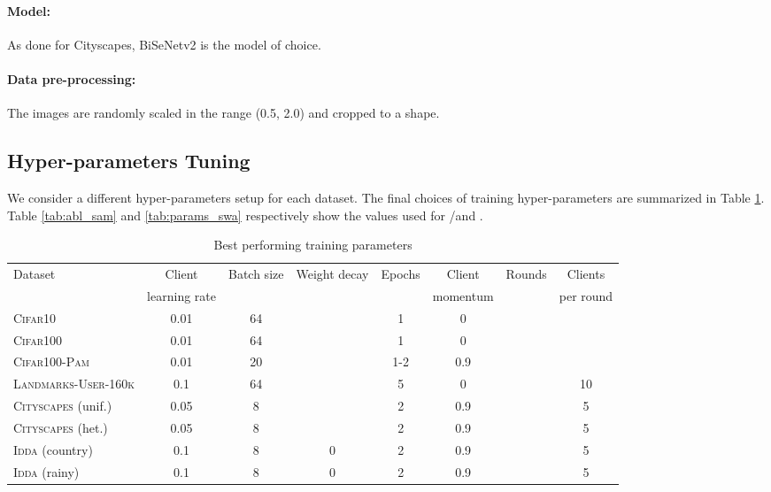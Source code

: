 \paragraph{Model:} As done for Cityscapes, BiSeNetv2 is the model of choice.

\paragraph{Data pre-processing:} The images are randomly scaled in the range (0.5, 2.0) and cropped to a  shape. 

\subsection{Hyper-parameters Tuning}
We consider a different hyper-parameters setup for each dataset. The final choices of training hyper-parameters are summarized in Table \ref{tab:best_params}. Table \ref{tab:abl_sam} and \ref{tab:params_swa} respectively show the values used for \sam/\asam and \swa.

\begin{table}[t]\centering
\caption{Best performing training parameters}\label{tab:best_params}
\scriptsize
    \begin{tabular}{lccccccc}
    \toprule
    \multirow{2}{*}{Dataset} & Client &\multirow{2}{*}{Batch size} & \multirow{2}{*}{Weight decay} & \multirow{2}{*}{Epochs} & Client &\multirow{2}{*}{Rounds} & Clients\\
    & learning rate& & &&momentum& & per round\\
    \midrule
    \textsc{Cifar10} &  0.01 & 64 &  & 1 & 0 & &  \\
    \textsc{Cifar100} & 0.01 & 64 &  & 1 & 0 & & \\
    \textsc{Cifar100-Pam} & 0.01 &20 & &1-2 &0.9 & & \\
    \textsc{Landmarks-User-160k} & 0.1 &64 & &5 &0 & &10 \\
    \textsc{Cityscapes} (unif.) & 0.05& 8& & 2& 0.9& & 5\\
    \textsc{Cityscapes} (het.) &  0.05& 8& & 2&0.9&  & 5\\
    \textsc{Idda} (country) & 0.1& 8& 0&2 &0.9&  & 5\\
    \textsc{Idda} (rainy) & 0.1& 8& 0&2 &0.9&  & 5\\
    \bottomrule
    \end{tabular}
\end{table}

